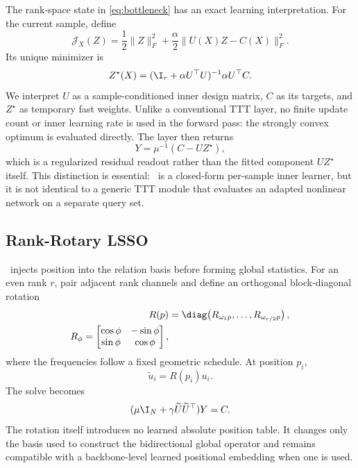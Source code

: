 The rank-space state in \cref{eq:bottleneck} has an exact learning
interpretation. For the current sample, define
\begin{equation}
  \mathcal J_X(Z)
  =\frac12\lVert Z\rVert_F^2
  +\frac{\alpha}{2}\lVert U(X)Z-C(X)\rVert_F^2.
  \label{eq:inner_objective}
\end{equation}
Its unique minimizer is
\begin{equation}
  Z^\star(X)
  =(\I_r+\alpha U^\top U)^{-1}\alpha U^\top C.
  \label{eq:inner_fast_weights}
\end{equation}
We interpret $U$ as a sample-conditioned inner design matrix, $C$ as its
targets, and $Z^\star$ as temporary fast weights. Unlike a conventional TTT
layer, no finite update count or inner learning rate is used in the forward
pass: the strongly convex optimum is evaluated directly. The layer then
returns
\begin{equation}
  Y=\mu^{-1}(C-UZ^\star),
  \label{eq:regularized_residual}
\end{equation}
which is a regularized residual readout rather than the fitted component
$UZ^\star$ itself. This distinction is essential: \LSSO\ is a closed-form
per-sample inner learner, but it is not identical to a generic TTT module that
evaluates an adapted nonlinear network on a separate query set.

\subsection{Rank-Rotary LSSO}

\RRLSSO\ injects position into the relation basis before forming global statistics. For an even rank $r$, pair adjacent rank channels and define an orthogonal block-diagonal rotation
\begin{align}
  R(p)&=\diag\!\left(R_{\omega_1 p},\ldots,R_{\omega_{r/2}p}\right),\\
  R_\phi=
  \begin{bmatrix}
    \cos\phi&-\sin\phi\\
    \sin\phi& \cos\phi
  \end{bmatrix},
  \label{eq:rank_rotation}
\end{align}
where the frequencies follow a fixed geometric schedule. At position $p_i$,
\begin{equation}
  \widetilde u_i=R(p_i)u_i.
\end{equation}
The solve becomes
\begin{equation}
  (\mu\I_N+\gamma\widetilde U\widetilde U^\top)Y=C.
  \label{eq:rrlsso}
\end{equation}
The rotation itself introduces no learned absolute position table. It changes
only the basis used to construct the bidirectional global operator and remains
compatible with a backbone-level learned positional embedding when one is
used.

